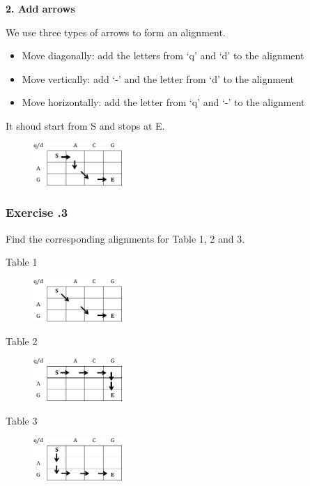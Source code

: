 \noindent \textbf{2. Add arrows}

We use three types of arrows to form an alignment.
\begin{itemize}
\item Move diagonally: add the letters from ‘q’ and ‘d’ to the alignment
\item Move vertically: add ‘-’ and the letter from ‘d’ to the alignment
\item Move horizontally: add the letter from ‘q’ and ‘-’ to the alignment
\end{itemize}

It shoud start from S and stops at E.

\begin{figure}[H]
  \centering
      \includegraphics[width=0.3\textwidth]{fig02/alignment_to_table_example.png}
\end{figure}

%
%
\subsubsection*{Exercise \thesection.3}

Find the corresponding alignments for Table 1, 2 and 3.

\begin{multicols}{3}
Table 1
\begin{figure}[H]
  \centering
      \includegraphics[width=0.3\textwidth]{fig02/alignment_to_table_exercise1.png}
\end{figure}

Table 2
\begin{figure}[H]
  \centering
      \includegraphics[width=0.3\textwidth]{fig02/alignment_to_table_exercise2.png}
\end{figure}

Table 3
\begin{figure}[H]
  \centering
      \includegraphics[width=0.3\textwidth]{fig02/alignment_to_table_exercise3.png}
\end{figure}

\end{multicols} 

%
